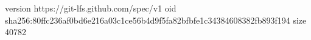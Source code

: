 version https://git-lfs.github.com/spec/v1
oid sha256:80ffc236af0bd6e216a03c1ce56b4d9f5fa82bfbfe1c34384608382fb893f194
size 40782
